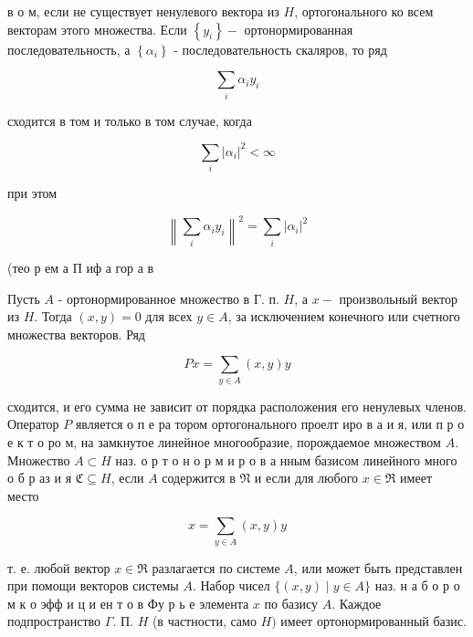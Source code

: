 \documentclass[10pt]{article}
\begin{document}
в о м, если не существует ненулевого вектора из $H$, ортогонального ко всем векторам этого множества. Если $\left\{y_{i}\right\}-$ ортонормированная последовательность, а $\left\{\alpha_{i}\right\}$ - последовательность скаляров, то ряд



\[

\sum_{i} \alpha_{i} y_{i}

\]



сходится в том и только в том случае, когда



\[

\sum_{i}\left|\alpha_{i}\right|^{2}<\infty

\]



при этом



\[

\left\|\sum_{i} \alpha_{i} y_{i}\right\|^{2}=\sum_{i}\left|\alpha_{i}\right|^{2}

\]



(тео р ем а П иф а гор а в



Пусть $A$ - ортонормированное множество в $Г$. п. $H$, а $x-$ произвольный вектор из $H$. Тогда $(x, y)=0$ для всех $y \in A$, за исключением конечного или счетного множества векторов. Ряд



\[

P x=\sum_{y \in A}(x, y) y

\]



сходится, и его сумма не зависит от порядка расположения его ненулевых членов. Оператор $P$ является о п е ра тором ортогонального проелт иро в а и я, или п р о е к т о ро м, на замкнутое линейное многообразие, порождаемое множеством $A$. Множество $A \subset H$ наз. о р т о н о р м и р о в а нным базисом линейного много о б р аз и я $\mathfrak{C} \subseteq H$, если $A$ содержится в $\mathfrak{N}$ и если для любого $x \in \Re$ имеет место



\[

x=\sum_{y \in A}(x, y) y

\]



т. е. любой вектор $x \in \Re$ разлагается по системе $A$, или может быть представлен при помощи векторов системы $A$. Набор чисел $\{(x, y) \mid y \in A\}$ наз. н а б о р о м к о эфф и ц и ен т о в Фу р ь е элемента $x$ по базису $A$. Каждое подпространство $\Gamma$. П. $H$ (в частности, само $H)$ имеет ортонормированный базис.
\end{document}
